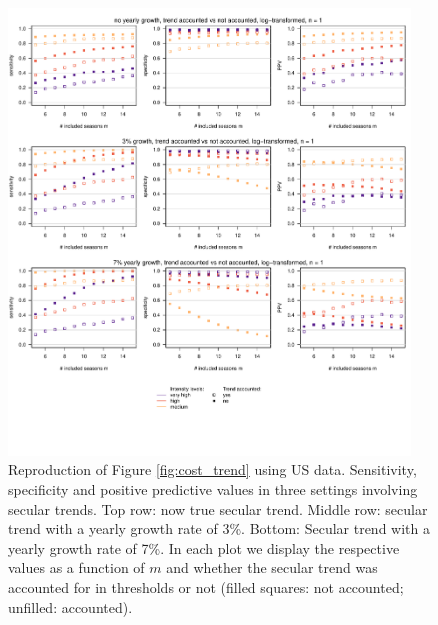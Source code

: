 \documentclass[12pt]{article}
\begin{document}
\begin{figure}[h!]
\begin{center}
\includegraphics[width = 0.95\textwidth]{figure/plot_cost_trend_us.pdf}
\end{center}
\caption{Reproduction of Figure \ref{fig:cost_trend} using US data. Sensitivity, specificity and positive predictive values in three settings involving secular trends. Top row: now true secular trend. Middle row: secular trend with a yearly growth rate of 3\%. Bottom: Secular trend with a yearly growth rate of 7\%. In each plot we display the respective values as a function of $m$ and whether the secular trend was accounted for in thresholds or not (filled squares: not accounted; unfilled: accounted).}
\end{figure}







{\footnotesize


}
\end{document}
